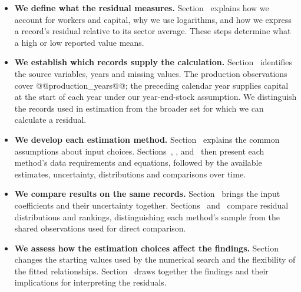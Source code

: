 \begin{itemize}
\item \textbf{We define what the residual measures.} Section~ explains how we account for workers and capital, why we use logarithms, and how we express a record's residual relative to its sector average. These steps determine what a high or low reported value means.
\item \textbf{We establish which records supply the calculation.} Section~ identifies the source variables, years and missing values. The production observations cover @@production_years@@; the preceding calendar year supplies capital at the start of each year under our year-end-stock assumption. We distinguish the records used in estimation from the broader set for which we can calculate a residual.
\item \textbf{We develop each estimation method.} Section~ explains the common assumptions about input choices. Sections~, ,  and~ then present each method's data requirements and equations, followed by the available estimates, uncertainty, distributions and comparisons over time.
\item \textbf{We compare results on the same records.} Section~ brings the input coefficients and their uncertainty together. Sections~ and~ compare residual distributions and rankings, distinguishing each method's sample from the shared observations used for direct comparison.
\item \textbf{We assess how the estimation choices affect the findings.} Section~ changes the starting values used by the numerical search and the flexibility of the fitted relationships. Section~ draws together the findings and their implications for interpreting the residuals.
\end{itemize}

